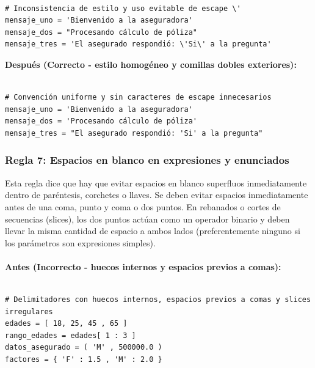 \documentclass{article}
\begin{document}
    	    \begin{verbatim}

# Inconsistencia de estilo y uso evitable de escape \'
mensaje_uno = 'Bienvenido a la aseguradora'
mensaje_dos = "Procesando cálculo de póliza"
mensaje_tres = 'El asegurado respondió: \'Si\' a la pregunta'

        	\end{verbatim}
    
        	\textbf{Después (Correcto - estilo homogéneo y comillas dobles exteriores):}
        	\begin{verbatim}

# Convención uniforme y sin caracteres de escape innecesarios
mensaje_uno = 'Bienvenido a la aseguradora'
mensaje_dos = 'Procesando cálculo de póliza'
mensaje_tres = "El asegurado respondió: 'Si' a la pregunta"

        	\end{verbatim}
	\newpage
    	\subsubsection*{Regla 7: Espacios en blanco en expresiones y enunciados}
        	Esta regla dice que hay que evitar espacios en blanco superfluos inmediatamente dentro de paréntesis, 
			corchetes o llaves. Se deben evitar espacios inmediatamente antes de una coma, punto y coma o dos puntos.
			En rebanados o cortes de secuencias (slices), los dos puntos actúan como un operador binario y deben llevar la 
			misma cantidad de espacio a ambos lados (preferentemente ninguno si los parámetros son expresiones simples).\\ \\
    
        	\textbf{Antes (Incorrecto - huecos internos y espacios previos a comas):}

        	\begin{verbatim}

# Delimitadores con huecos internos, espacios previos a comas y slices irregulares
edades = [ 18, 25, 45 , 65 ]
rango_edades = edades[ 1 : 3 ]
datos_asegurado = ( 'M' , 500000.0 )
factores = { 'F' : 1.5 , 'M' : 2.0 }

        	\end{verbatim}
    
\end{document}
